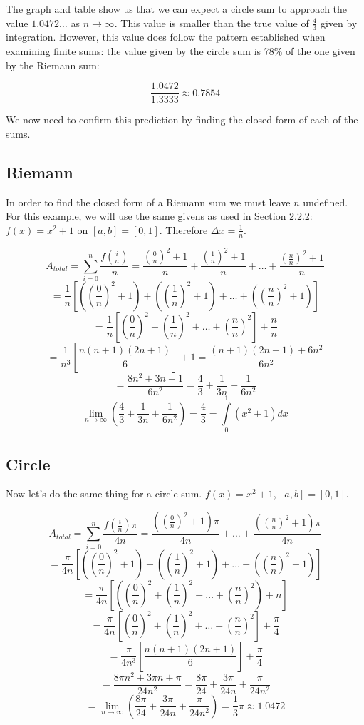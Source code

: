\documentclass[12pt]{article}
\begin{document}
      The graph and table show us that we can expect a circle sum to approach the value \( 1.0472\dots \) as \( n \to \infty \). This value is smaller than the true value of \( \frac{4}{3} \) given by integration. However, this value does follow the pattern established when examining finite sums: the value given by the circle sum is 78\% of the one given by the Riemann sum:

      \[ \frac{1.0472}{1.3333} \approx 0.7854 \]

      We now need to confirm this prediction by finding the closed form of each of the sums.

    \subsection{Riemann}
      In order to find the closed form of a Riemann sum we must leave \( n \) undefined. For this example, we will use the same givens as used in Section 2.2.2: \( f(x) = x^2 + 1 \) on \( [a,b] = [0,1] \). Therefore \( \Delta x = \frac{1}{n} \).

      \[ A_{total} = \displaystyle \sum_{i=0}^n \frac{f(\frac{i}{n})}{n} = \frac{(\frac{0}{n})^2+1}{n} + \frac{(\frac{1}{n})^2+1}{n} + \dots + \frac{(\frac{n}{n})^2+1}{n} \]
      \[ = \frac{1}{n}\left[ \left( \left(\frac{0}{n}\right)^2 + 1 \right) + \left( \left(\frac{1}{n}\right)^2 + 1 \right) + \dots + \left( \left(\frac{n}{n}\right)^2 + 1 \right) \right] \]
      \[ = \frac{1}{n}\left[ \left( \frac{0}{n} \right)^2 + \left( \frac{1}{n} \right)^2 + \dots + \left( \frac{n}{n} \right)^2 \right] + \frac{n}{n} \]
      \[ = \frac{1}{n^3}\left[ \frac{n(n+1)(2n+1)}{6} \right] + 1 = \frac{(n+1)(2n+1) + 6n^2}{6n^2} \]
      \[ = \frac{8n^2+3n+1}{6n^2} = \frac{4}{3} + \frac{1}{3n} + \frac{1}{6n^2} \]
      \[ \displaystyle\lim_{n \to \infty}\left(\frac{4}{3} + \frac{1}{3n} + \frac{1}{6n^2} \right) = \frac{4}{3} = \int\limits_0^1 (x^2+1)dx \]

    \subsection{Circle}
      Now let's do the same thing for a circle sum. \( f(x) = x^2 + 1, [a,b] = [0,1] \).

      \[ A_{total} = \displaystyle \sum_{i=0}^n \frac{f\left(\frac{i}{n}\right)\pi}{4n} = \frac{(\left(\frac{0}{n}\right)^2+1)\pi}{4n} + \dots + \frac{(\left(\frac{n}{n}\right)^2+1)\pi}{4n} \]
      \[ = \frac{\pi}{4n}\left[\left(\left(\frac{0}{n}\right)^2 + 1 \right) + \left(\left(\frac{1}{n}\right)^2 + 1 \right) + \dots + \left(\left(\frac{n}{n}\right)^2 + 1 \right)\right] \]
      \[ = \frac{\pi}{4n}\left[\left(\left(\frac{0}{n}\right)^2 + \left(\frac{1}{n}\right)^2 + \dots + \left(\frac{n}{n}\right)^2\right) + n \right] \]
      \[ = \frac{\pi}{4n}\left[\left(\frac{0}{n}\right)^2 + \left(\frac{1}{n}\right)^2 + \dots + \left(\frac{n}{n}\right)^2 \right] + \frac{\pi}{4} \]
      \[ = \frac{\pi}{4n^3}\left[ \frac{n(n+1)(2n+1)}{6} \right] + \frac{\pi}{4} \]
      \[ = \frac{8\pi n^2 + 3\pi n + \pi}{24n^2} = \frac{8\pi}{24} + \frac{3\pi}{24n} + \frac{\pi}{24n^2} \]
      \[ = \displaystyle\lim_{n \to \infty}\left(\frac{8\pi}{24} + \frac{3\pi}{24n} + \frac{\pi}{24n^2}\right) = \frac{1}{3}\pi \approx 1.0472 \]
\end{document}
